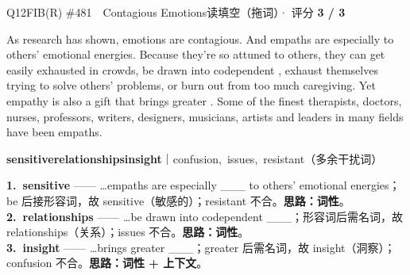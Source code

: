 \begin{qblock}{Q12\quad FIB(R) \#481\ \ Contagious Emotions}{读填空（拖词）· 评分 \textcolor{cAccent}{\bfseries 3 / 3}}
\begin{promptbox}
As research has shown, emotions are contagious. And empaths are especially  to others' emotional energies. Because they're so attuned to others, they can get easily exhausted in crowds, be drawn into codependent , exhaust themselves trying to solve others' problems, or burn out from too much caregiving. Yet empathy is also a gift that brings greater . Some of the finest therapists, doctors, nurses, professors, writers, designers, musicians, artists and leaders in many fields have been empaths.
\end{promptbox}
{\small \textbf{sensitive}\quad \textbf{relationships}\quad \textbf{insight}\quad ｜\quad confusion,\ issues,\ resistant（多余干扰词）}
\begin{notebox}\footnotesize
\textbf{1.\ sensitive} —— …empaths are especially \_\_\_ to others' emotional energies；be 后接形容词，故 sensitive（敏感的）；resistant 不合。\textbf{思路：词性}。\\[2pt]
\textbf{2.\ relationships} —— …be drawn into codependent \_\_\_；形容词后需名词，故 relationships（关系）；issues 不合。\textbf{思路：词性}。\\[2pt]
\textbf{3.\ insight} —— …brings greater \_\_\_；greater 后需名词，故 insight（洞察）；confusion 不合。\textbf{思路：词性 + 上下文}。
\end{notebox}
\end{qblock}

